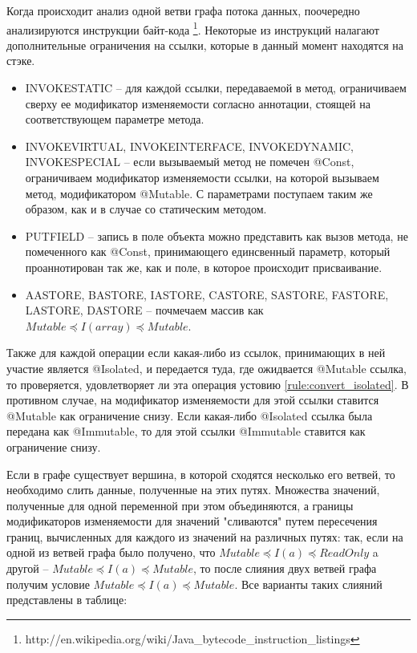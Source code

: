 Когда происходит анализ одной ветви графа потока данных, поочередно анализируются инструкции байт-кода \footnote{http://en.wikipedia.org/wiki/Java\_bytecode\_instruction\_listings}. Некоторые из инструкций налагают дополнительные ограничения на ссылки, которые в данный момент находятся на стэке.

\begin{itemize}
	\item {\small INVOKESTATIC} -- для каждой ссылки, передаваемой в метод, ограничиваем сверху ее модификатор изменяемости согласно аннотации, стоящей на соответствующем параметре метода.  
	\item {\small INVOKEVIRTUAL, INVOKEINTERFACE, INVOKEDYNAMIC, INVOKESPECIAL} -- если вызываемый метод не помечен @Const, ограничиваем модификатор изменяемости ссылки, на которой вызываем метод, модификатором @Mutable. С параметрами поступаем таким же образом, как и в случае со статическим методом. 
	\item {\small PUTFIELD} -- запись в поле объекта можно представить как вызов метода, не помеченного как @Const, принимающего единсвенный параметр, который проаннотирован так же, как и поле, в которое происходит присваивание.
	\item {\small AASTORE, BASTORE, IASTORE, CASTORE, SASTORE, FASTORE, LASTORE, DASTORE} -- почмечаем массив как $Mutable \preceq I(array) \preceq Mutable$.
\end{itemize}

Также для каждой операции если какая-либо из ссылок, принимающих в ней участие является @Isolated, и передается туда, где ожидвается @Mutable ссылка, то проверяется, удовлетворяет ли эта операция устовию \ref{rule:convert_isolated}. В противном случае, на модификатор изменяемости для этой ссылки ставится @Mutable как ограничение снизу. Если какая-либо @Isolated ссылка была передана как @Immutable, то для этой ссылки @Immutable ставится как ограничение снизу.   

Если в графе существует вершина, в которой сходятся несколько его ветвей, то необходимо слить данные, полученные на этих путях. Множества значений, полученные для одной переменной при этом объединяются, а границы модификаторов изменяемости для значений "сливаются" путем пересечения границ, вычисленных для каждого из значений на различных путях: так, если на одной из ветвей графа было получено, что $Mutable \preceq I(a) \preceq  ReadOnly$ a другой -- $Mutable \preceq I(a) \preceq  Mutable$, то после слияния двух ветвей графа получим условие $Mutable \preceq I(a) \preceq  Mutable$. Все варианты таких слияний представлены в таблице:

